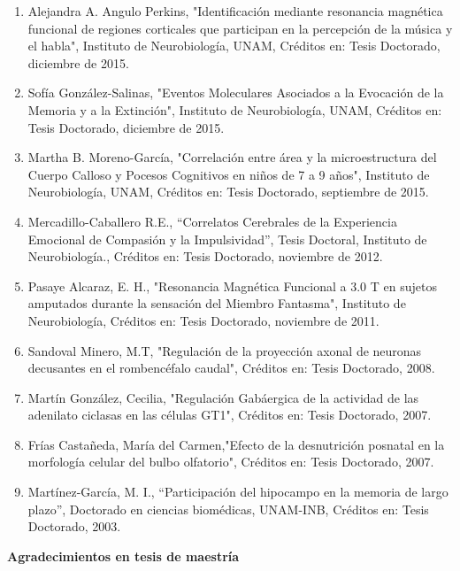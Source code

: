 \documentclass[12pt]{article}
\begin{document}
\begin{enumerate}
\item Alejandra A. Angulo Perkins, "Identificación mediante resonancia magnética funcional de regiones corticales que participan en la 
percepción de la música y el habla", Instituto de Neurobiología, UNAM, Créditos en: Tesis Doctorado, diciembre de 2015.

\item Sofía González-Salinas, "Eventos Moleculares Asociados a la Evocación de la Memoria y a la Extinción", Instituto de 
Neurobiología, 
UNAM, Créditos en: Tesis Doctorado, diciembre de 2015.

\item Martha B. Moreno-García, "Correlación entre área y la microestructura del Cuerpo Calloso y Pocesos Cognitivos en niños de 7 a 9 
años", Instituto de Neurobiología, UNAM, Créditos en: Tesis Doctorado, septiembre de 2015.

\item Mercadillo-Caballero R.E., “Correlatos Cerebrales de la Experiencia Emocional de Compasión y la Impulsividad”, Tesis Doctoral, 
Instituto de Neurobiología., Créditos en: Tesis Doctorado, noviembre de 2012.

\item Pasaye Alcaraz, E. H., "Resonancia Magnética Funcional a 3.0 T en sujetos amputados durante la sensación del Miembro Fantasma", 
Instituto de Neurobiología, Créditos en: Tesis Doctorado, noviembre de 2011.

\item Sandoval Minero, M.T, "Regulación de la proyección axonal de neuronas decusantes en el rombencéfalo caudal", Créditos en: Tesis 
Doctorado, 2008.

\item Martín González, Cecilia, "Regulación Gabáergica de la actividad de las adenilato ciclasas en las células GT1", Créditos en: 
Tesis 
Doctorado, 2007.

\item Frías Castañeda, María del Carmen,"Efecto de la desnutrición posnatal en la morfología celular del bulbo olfatorio", Créditos en: 
Tesis Doctorado, 2007.

\item Martínez-García, M. I., “Participación del hipocampo en la memoria de largo plazo”, Doctorado en ciencias biomédicas, UNAM-INB, 
Créditos en: Tesis Doctorado, 2003.
\end{enumerate}

\textbf{Agradecimientos en tesis de maestría}
\end{document}
